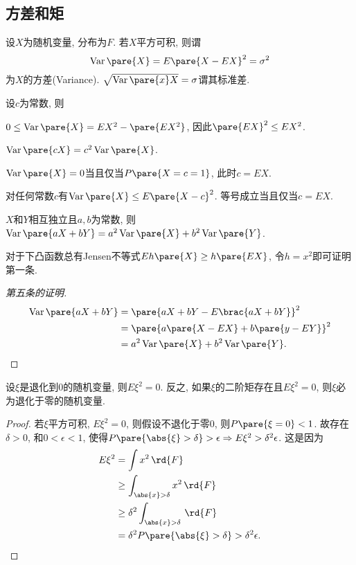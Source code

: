 \documentclass{ctexart}
\DeclareMathOperator{\Var}{Var}
\begin{document}

\subsection{方差和矩} %
\label{sub:方差和矩}

\begin{definition}
    设$X$为随机变量, 分布为$F$. 若$X$平方可积, 则谓
    \[ \Var\pare{X} = E\pare{X-EX}^2 = \sigma^2 \]
    为$X$的方差(Variance). $\sqrt{\Var\pare{x}X} = \sigma$谓其标准差.
\end{definition}
\begin{theorem}
    设$c$为常数, 则
    \begin{cenum}
        \item $0 \le \Var\pare{X} = EX^2 - \pare{EX^2}$, 因此$\pare{EX}^2 \le EX^2$.
        \item $\Var\pare{cX} = c^2 \Var\pare{X}$.
        \item $\Var\pare{X} = 0$当且仅当$P\pare{X=c=1}$, 此时$c=EX$.
        \item 对任何常数$c$有$\Var\pare{X} \le E\pare{X-c}^2$. 等号成立当且仅当$c=EX$.
        \item $X$和$Y$相互独立且$a,b$为常数, 则$\Var\pare{aX+bY} = a^2\Var\pare{X} + b^2\Var\pare{Y}$.
    \end{cenum}
\end{theorem}
\begin{remark}
    对于下凸函数总有Jensen不等式$Eh\pare{X} \ge h\pare{EX}$, 令$h = x^2$即可证明第一条.
\end{remark}
\begin{proof}[第五条的证明]
    \begin{align*}
        \Var\pare{aX+bY} &= \pare{aX+bY - E\brac{aX+bY}}^2 \\
        &= \pare{a\pare{X-EX}+b\pare{y-EY}}^2 \\
        &= a^2\Var\pare{X} + b^2\Var\pare{Y}. \qedhere
    \end{align*}
\end{proof}
\begin{lemma}
    \label{lem:二阶退化随机变量}
    设$\xi$是退化到$0$的随机变量, 则$E\xi^2 = 0$. 反之, 如果$\xi$的二阶矩存在且$E\xi^2 = 0$, 则$\xi$必为退化于零的随机变量.
\end{lemma}
\begin{proof}
    若$\xi$平方可积, $E\xi^2 = 0$, 则假设不退化于零$0$, 则$P\pare{\xi = 0} < 1$. 故存在$\delta > 0$, 和$0<\epsilon < 1$, 使得$P\pare{\abs{\xi} > \delta} > \epsilon \Rightarrow E\xi^2 > \delta^2\epsilon$. 这是因为
    \begin{align*}
        E\xi^2 &= \int x^2\,\rd{F} \\
        &\ge \int_{\abs{x}>\delta} x^2\,\rd{F} \\
        &\ge \delta^2 \int_{\abs{x}>\delta} \,\rd{F} \\
        &= \delta^2 P\pare{\abs{\xi}>\delta} > \delta^2\epsilon. \qedhere
    \end{align*}
\end{proof}
\end{document}
